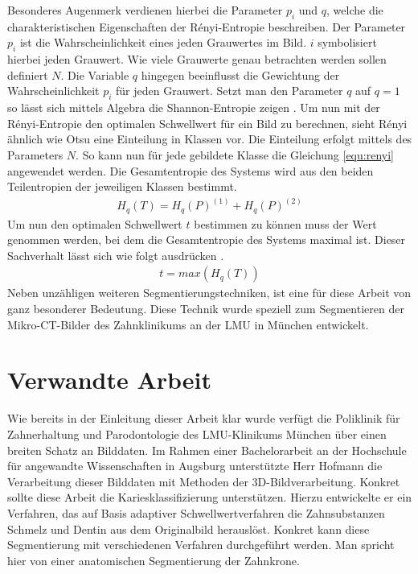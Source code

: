 Besonderes Augenmerk verdienen hierbei die Parameter $p_{i}$ und $q$, welche die
charakteristischen Eigenschaften der Rényi-Entropie beschreiben. Der Parameter
$p_{i}$ ist die Wahrscheinlichkeit eines jeden Grauwertes im Bild. $i$ symbolisiert
hierbei jeden Grauwert. Wie viele Grauwerte genau betrachten werden sollen
definiert $N$. Die Variable $q$ hingegen beeinflusst die Gewichtung der Wahrscheinlichkeit
$p_{i}$ für jeden Grauwert. Setzt man den Parameter $q$ auf $q = 1$ so lässt
sich mittels Algebra die Shannon-Entropie zeigen \citep[vgl.][K.~2]{bromiley2004}.
Um nun mit der Rényi-Entropie den optimalen Schwellwert für ein Bild zu
berechnen, sieht Rényi ähnlich wie Otsu eine Einteilung in Klassen vor. Die
Einteilung erfolgt mittels des Parameters $N$. So kann nun für jede gebildete Klasse
die Gleichung \ref{equ:renyi} angewendet werden. Die Gesamtentropie des Systems
wird aus den beiden Teilentropien der jeweiligen Klassen bestimmt\citep[vgl.][K.~2]{bromiley2004}.
\begin{align}
	H_{q}(T) = H_{q}(P)^{(1)}+ H_{q}(P)^{(2)}
\end{align}
Um nun den optimalen Schwellwert $t$ bestimmen zu können muss der Wert genommen werden,
bei dem die Gesamtentropie des Systems maximal ist. Dieser Sachverhalt lässt sich
wie folgt ausdrücken \citep[vgl.][K.~2]{bromiley2004}.
\begin{align}
	t = max(H_{q}(T))
\end{align}
Neben unzähligen weiteren Segmentierungstechniken, ist eine für diese Arbeit von
ganz besonderer Bedeutung. Diese Technik wurde speziell zum Segmentieren der Mikro-\ac{CT}-Bilder
des Zahnklinikums an der \ac{LMU} in München entwickelt.

\pagebreak

\section{Verwandte Arbeit}
\label{sec:verwwandte_arbeit} Wie bereits in der Einleitung dieser Arbeit klar
wurde verfügt die Poliklinik für Zahnerhaltung und Parodontologie des \ac{LMU}-Klinikums
München über einen breiten Schatz an Bilddaten. Im Rahmen einer Bachelorarbeit
an der Hochschule für angewandte Wissenschaften in Augsburg unterstützte Herr
Hofmann die Verarbeitung dieser Bilddaten mit Methoden der 3D-Bildverarbeitung. Konkret
sollte diese Arbeit die Kariesklassifizierung unterstützen. Hierzu entwickelte
er ein Verfahren, das auf Basis adaptiver Schwellwertverfahren die Zahnsubstanzen
Schmelz und Dentin aus dem Originalbild herauslöst. Konkret kann diese
Segmentierung mit verschiedenen Verfahren durchgeführt werden. Man spricht hier von
einer anatomischen Segmentierung der Zahnkrone.

